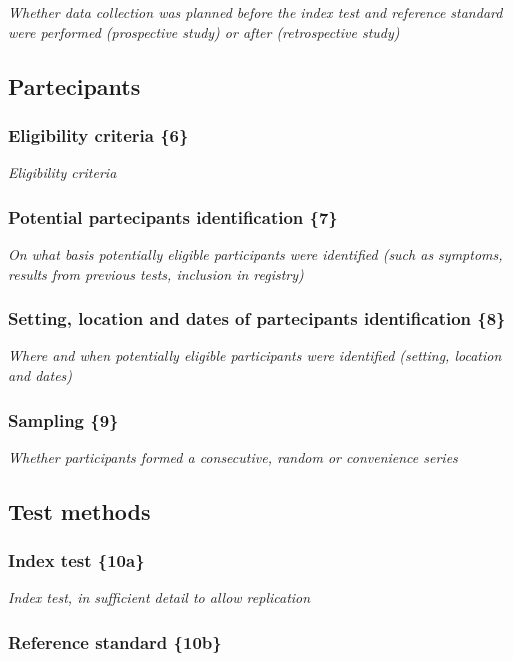 {\em Whether data collection was planned before the index test and
reference standard were performed (prospective study) or after
(retrospective study)}

\subsection{Partecipants}

\subsubsection{Eligibility criteria \{6\}}

{\em Eligibility criteria}

\subsubsection{Potential partecipants identification \{7\}}

{\em On what basis potentially eligible participants were identified (such
as symptoms, results from previous tests, inclusion in registry)}

\subsubsection{Setting, location and dates of partecipants
  identification \{8\}}

{\em Where and when potentially eligible participants were identified
  (setting, location and dates)}

\subsubsection{Sampling \{9\}}

{\em Whether participants formed a consecutive, random or convenience series}

\subsection{Test methods}

\subsubsection{Index test \{10a\}}

{\em Index test, in sufficient detail to allow replication}

\subsubsection{Reference standard \{10b\}}

